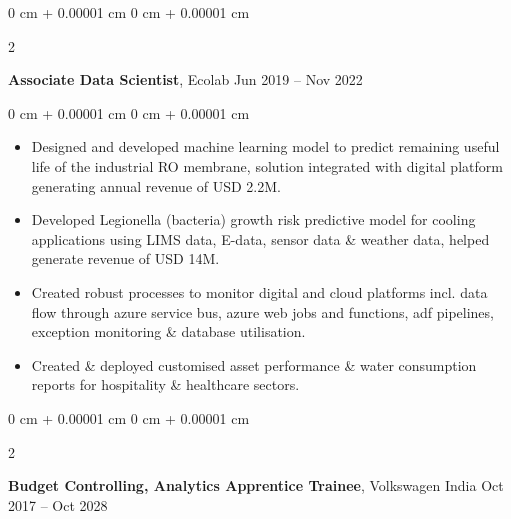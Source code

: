 \documentclass[10pt, letterpaper]{article}
\newenvironment{highlights}{
    \begin{itemize}[
        topsep=0.10 cm,
        parsep=0.10 cm,
        partopsep=0pt,
        itemsep=0pt,
        leftmargin=0 cm + 10pt
    ]
}{
    \end{itemize}
} %
\newenvironment{onecolentry}{
    \begin{adjustwidth}{
        0 cm + 0.00001 cm
    }{
        0 cm + 0.00001 cm
    }
}{
    \end{adjustwidth}
} %
\newenvironment{twocolentry}[2][]{
    \onecolentry
    \def\secondColumn{#2}
    \setcolumnwidth{\fill, 4.5 cm}
    \begin{paracol}{2}
}{
    \switchcolumn \raggedleft \secondColumn
    \end{paracol}
    \endonecolentry
} %
\begin{document}
        \vspace{0.2 cm}
        \begin{twocolentry}{
            Jun 2019 – Nov 2022
        }
            \textbf{Associate Data Scientist}, Ecolab\end{twocolentry}

        \vspace{0.10 cm}
        \begin{onecolentry}
            \begin{highlights}
                \item 
Designed and developed machine learning model to predict remaining useful life of the industrial RO membrane, solution integrated with digital platform generating annual revenue of USD 2.2M.
                \item 
Developed Legionella (bacteria) growth risk predictive model for cooling applications using LIMS data, E-data, sensor data \& weather data, helped generate revenue of USD 14M.
                            

                \item 
Created robust processes to monitor digital and cloud platforms incl. data flow through azure service bus, azure web jobs and functions, adf pipelines, exception monitoring \& database utilisation.
                                \item 
Created \& deployed customised asset performance \& water consumption reports for hospitality \& healthcare sectors.
            \end{highlights}
        \end{onecolentry}

        \vspace{0.2 cm}
        \begin{twocolentry}{
            Oct 2017 – Oct 2028
        }
            \textbf{Budget Controlling, Analytics Apprentice Trainee}, Volkswagen India\end{twocolentry}
\end{document}
